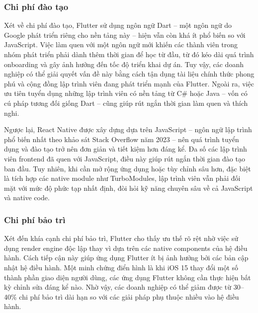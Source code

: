 \subsubsection{Chi phí đào tạo}


    \hspace*{0.8cm}Xét về chi phí đào tạo, Flutter sử dụng ngôn ngữ Dart – một ngôn ngữ do Google phát triển riêng cho nền tảng này – hiện vẫn còn khá ít phổ biến so với JavaScript. Việc làm quen với một ngôn ngữ mới khiến các thành viên trong nhóm phát triển phải dành thêm thời gian để học từ đầu, từ đó kéo dài quá trình onboarding và gây ảnh hưởng đến tốc độ triển khai dự án. Tuy vậy, các doanh nghiệp có thể giải quyết vấn đề này bằng cách tận dụng tài liệu chính thức phong phú và cộng đồng lập trình viên đang phát triển mạnh của Flutter. Ngoài ra, việc ưu tiên tuyển dụng những lập trình viên có nền tảng từ C\# hoặc Java – vốn có cú pháp tương đối giống Dart – cũng giúp rút ngắn thời gian làm quen và thích nghi.

    \vspace{0.5em}

    \hspace*{1.5em}Ngược lại, React Native được xây dựng dựa trên JavaScript – ngôn ngữ lập trình phổ biến nhất theo khảo sát Stack Overflow năm 2023 – nên quá trình tuyển dụng và đào tạo trở nên đơn giản và tiết kiệm hơn đáng kể. Đa số các lập trình viên frontend đã quen với JavaScript, điều này giúp rút ngắn thời gian đào tạo ban đầu. Tuy nhiên, khi cần mở rộng ứng dụng hoặc tùy chỉnh sâu hơn, đặc biệt là tích hợp các native module như TurboModules, lập trình viên vẫn phải đối mặt với mức độ phức tạp nhất định, đòi hỏi kỹ năng chuyên sâu về cả JavaScript và native code.
\vspace{0.5em}

\subsubsection{Chi phí bảo trì}


    \hspace*{0.8cm}Xét đến khía cạnh chi phí bảo trì, Flutter cho thấy ưu thế rõ rệt nhờ việc sử dụng render engine độc lập thay vì dựa trên các native components của hệ điều hành. Cách tiếp cận này giúp ứng dụng Flutter ít bị ảnh hưởng bởi các bản cập nhật hệ điều hành. Một minh chứng điển hình là khi iOS 15 thay đổi một số thành phần giao diện người dùng, các ứng dụng Flutter không cần thực hiện bất kỳ chỉnh sửa đáng kể nào. Nhờ vậy, các doanh nghiệp có thể giảm được từ 30–40\% chi phí bảo trì dài hạn so với các giải pháp phụ thuộc nhiều vào hệ điều hành.

